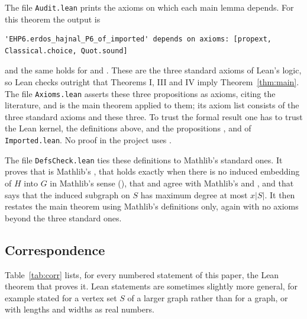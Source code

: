 The file \texttt{Audit.lean} prints the axioms on which each main lemma depends. For this theorem the
output is
\begin{lstlisting}
'EHP6.erdos_hajnal_P6_of_imported' depends on axioms: [propext, Classical.choice, Quot.sound]
\end{lstlisting}
and the same holds for  and .
These are the three standard axioms of Lean's logic, so Lean checks outright that Theorems I, III and IV
imply Theorem~\ref{thm:main}. The file \texttt{Axioms.lean} asserts these three propositions as
axioms, citing the literature, and  is the main theorem applied to
them; its axiom list consists of the three standard axioms and these three. To trust the formal result
one has to trust the Lean kernel, the definitions above, and the propositions ,
 and  of \texttt{Imported.lean}.
No proof in the project uses .

The file \texttt{DefsCheck.lean} ties these definitions to Mathlib's standard ones. It proves that
 is Mathlib's , that  holds exactly when there is no induced
embedding of $H$ into $G$ in Mathlib's sense (), that  and
 agree with Mathlib's  and , and that 
says that the induced subgraph on $S$ has maximum degree at most $x|S|$. It then restates the main
theorem using Mathlib's definitions only, again with no axioms beyond the three standard ones.

\subsection{Correspondence}
Table~\ref{tab:corr} lists, for every numbered statement of this paper, the Lean theorem that proves it.
Lean statements are sometimes slightly more general, for example stated for a vertex set $S$ of a larger
graph rather than for a graph, or with lengths and widths as real numbers.

